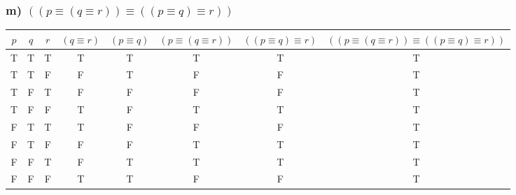 \documentclass{article}
\begin{document}
\subsubsection{m) $((p \equiv (q \equiv r)) \equiv ((p \equiv q) \equiv r))$}
\begin{center}
    \begin{NiceTabular}{|c|c|c|c|c|c|c|c|}
        \hline
        $p$         & $q$         & $r$         & $(q \equiv r)$ & $(p \equiv q)$ & $(p \equiv (q \equiv r))$ & $((p \equiv q) \equiv r)$ & $((p \equiv (q \equiv r)) \equiv ((p \equiv q) \equiv r))$ \\
        \hline
        \ttfamily T & \ttfamily T & \ttfamily T & \ttfamily T    & \ttfamily T    & \ttfamily T               &  \ttfamily T              & \ttfamily T\\
        \ttfamily T & \ttfamily T & \ttfamily F & \ttfamily F    & \ttfamily T    & \ttfamily F               &  \ttfamily F              & \ttfamily T\\
        \ttfamily T & \ttfamily F & \ttfamily T & \ttfamily F    & \ttfamily F    & \ttfamily F               &  \ttfamily F              & \ttfamily T\\
        \ttfamily T & \ttfamily F & \ttfamily F & \ttfamily T    & \ttfamily F    & \ttfamily T               &  \ttfamily T              & \ttfamily T\\
        \ttfamily F & \ttfamily T & \ttfamily T & \ttfamily T    & \ttfamily F    & \ttfamily F               &  \ttfamily F              & \ttfamily T\\
        \ttfamily F & \ttfamily T & \ttfamily F & \ttfamily F    & \ttfamily F    & \ttfamily T               &  \ttfamily T              & \ttfamily T\\
        \ttfamily F & \ttfamily F & \ttfamily T & \ttfamily F    & \ttfamily T    & \ttfamily T               &  \ttfamily T              & \ttfamily T\\
        \ttfamily F & \ttfamily F & \ttfamily F & \ttfamily T    & \ttfamily T    & \ttfamily F               &  \ttfamily F              & \ttfamily T\\
        \hline
    \end{NiceTabular}
\end{center}
\end{document}
